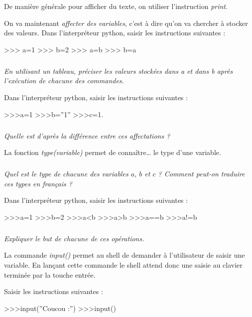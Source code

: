 \documentclass[10pt]{article}
\begin{document}
\begin{rem}
De manière générale pour afficher du texte, on utiliser l'instruction \textsl{print}.
\end{rem}

On va maintenant \textit{affecter des variables}, c'est à dire qu'on va chercher à stocker des valeurs. Dans l'interpréteur python, saisir les instructions suivantes :

\begin{py}
\begin{python}
>>> a=1
>>> b=2
>>> a=b
>>> b=a
\end{python}
\end{py}

\subparagraph{} 
\textit{En utilisant un tableau, préciser les valeurs stockées dans a et dans b après l’exécution de chacune des commandes.}


Dans l'interpréteur python, saisir les instructions suivantes :
\begin{py}
\begin{python}
>>>a=1
>>>b=''1''
>>>c=1.
\end{python}
\end{py}


\subparagraph{} 
\textit{Quelle est d'après la différence entre ces affectations ?}

La fonction \textsl{type(variable)} permet de connaître… le type d’une variable. 


\subparagraph{} 
\textit{Quel est le type de chacune des variables $a$, $b$ et $c$ ? Comment peut-on traduire ces types en français ?}

Dans l'interpréteur python, saisir les instructions suivantes :
\begin{py}
\begin{python}
>>>a=1
>>>b=2
>>>a<b
>>>a>b
>>>a==b
>>>a!=b
\end{python}
\end{py}

\subparagraph{} 
\textit{Expliquer le but de chacune de ces opérations.}


La commande \textsl{input()} permet au shell de demander à l’utilisateur de saisir une variable. En lançant cette commande le shell attend donc une saisie au clavier terminée par la touche entrée. 

Saisir les instructions suivantes : 
\begin{py}
\begin{python}
>>>input(''Coucou :'')
>>>input()
\end{python}
\end{py}
\end{document}
